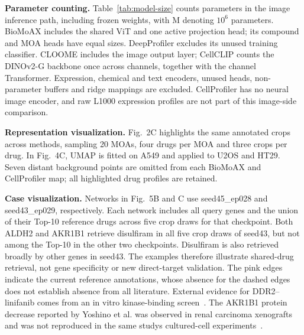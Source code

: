 \textbf{Parameter counting.} Table~\ref{tab:model-size} counts parameters in the image inference path, including frozen weights, with M denoting $10^6$ parameters. BioMoAX includes the shared ViT and one active projection head; its compound and MOA heads have equal sizes. DeepProfiler excludes its unused training classifier. CLOOME includes the image output layer; CellCLIP counts the DINOv2-G backbone once across channels, together with the channel Transformer. Expression, chemical and text encoders, unused heads, non-parameter buffers and ridge mappings are excluded. CellProfiler has no neural image encoder, and raw L1000 expression profiles are not part of this image-side comparison.

\textbf{Representation visualization.} Fig.~2C highlights the same annotated crops across methods, sampling 20 MOAs, four drugs per MOA and three crops per drug. In Fig.~4C, UMAP is fitted on A549 and applied to U2OS and HT29. Seven distant background points are omitted from each BioMoAX and CellProfiler map; all highlighted drug profiles are retained.

\textbf{Case visualization.} Networks in Fig.~5B and C use seed45\_ep028 and seed43\_ep029, respectively. Each network includes all query genes and the union of their Top-10 reference drugs across five crop draws for that checkpoint. Both ALDH2 and AKR1B1 retrieve disulfiram in all five crop draws of seed43, but not among the Top-10 in the other two checkpoints. Disulfiram is also retrieved broadly by other genes in seed43. The examples therefore illustrate shared-drug retrieval, not gene specificity or new direct-target validation. The pink edges indicate the current reference annotations, whose absence for the dashed edges does not establish absence from all literature. External evidence for DDR2--linifanib comes from an in vitro kinase-binding screen~\cite{karaman2008}. The AKR1B1 protein decrease reported by Yoshino et al. was observed in renal carcinoma xenografts and was not reproduced in the same study\textquotesingle s cultured-cell experiments~\cite{yoshino2020npl4}.
